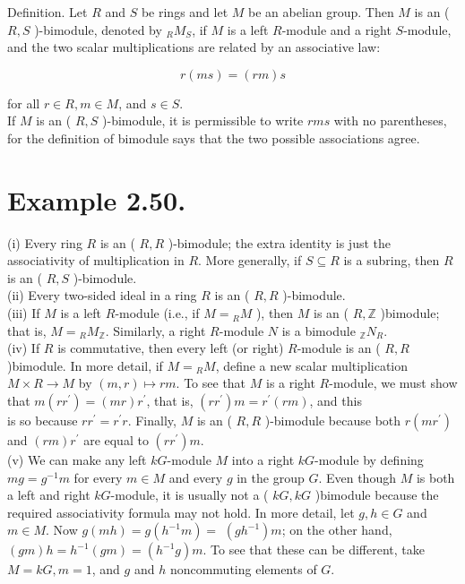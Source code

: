 \documentclass[10pt]{article}
\begin{document}
Definition. Let $R$ and $S$ be rings and let $M$ be an abelian group. Then $M$ is an ( $R, S$ )-bimodule, denoted by ${ }_{R} M_{S}$, if $M$ is a left $R$-module and a right $S$-module, and the two scalar multiplications are related by an associative law:

$$
r(m s)=(r m) s
$$

for all $r \in R, m \in M$, and $s \in S$.\\
If $M$ is an ( $R, S$ )-bimodule, it is permissible to write $r m s$ with no parentheses, for the definition of bimodule says that the two possible associations agree.

\section*{Example 2.50.}
(i) Every ring $R$ is an ( $R, R$ )-bimodule; the extra identity is just the associativity of multiplication in $R$. More generally, if $S \subseteq R$ is a subring, then $R$ is an ( $R, S$ )-bimodule.\\
(ii) Every two-sided ideal in a ring $R$ is an ( $R, R$ )-bimodule.\\
(iii) If $M$ is a left $R$-module (i.e., if $M={ }_{R} M$ ), then $M$ is an ( $R, \mathbb{Z}$ )bimodule; that is, $M={ }_{R} M_{\mathbb{Z}}$. Similarly, a right $R$-module $N$ is a bimodule ${ }_{\mathbb{Z}} N_{R}$.\\
(iv) If $R$ is commutative, then every left (or right) $R$-module is an ( $R, R$ )bimodule. In more detail, if $M={ }_{R} M$, define a new scalar multiplication $M \times R \rightarrow M$ by $(m, r) \mapsto r m$. To see that $M$ is a right $R$-module, we must show that $m\left(r r^{\prime}\right)=(m r) r^{\prime}$, that is, $\left(r r^{\prime}\right) m=r^{\prime}(r m)$, and this\\
is so because $r r^{\prime}=r^{\prime} r$. Finally, $M$ is an ( $R, R$ )-bimodule because both $r\left(m r^{\prime}\right)$ and $(r m) r^{\prime}$ are equal to $\left(r r^{\prime}\right) m$.\\
(v) We can make any left $k G$-module $M$ into a right $k G$-module by defining $m g=g^{-1} m$ for every $m \in M$ and every $g$ in the group $G$. Even though $M$ is both a left and right $k G$-module, it is usually not a ( $k G, k G$ )bimodule because the required associativity formula may not hold. In more detail, let $g, h \in G$ and $m \in M$. Now $g(m h)=g\left(h^{-1} m\right)=$ $\left(g h^{-1}\right) m$; on the other hand, $(g m) h=h^{-1}(g m)=\left(h^{-1} g\right) m$. To see that these can be different, take $M=k G, m=1$, and $g$ and $h$ noncommuting elements of $G$.
\end{document}
